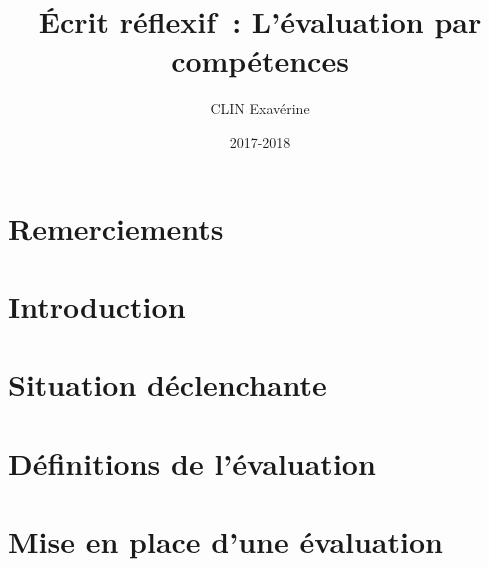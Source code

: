 \documentclass[a4paper, 12pt, french]{article}
\title{Écrit réflexif~: L'évaluation par compétences}
\author{CLIN Exavérine}
\date{2017-2018}
\begin{document}


\thispagestyle{empty}

\newpage
\part*{Remerciements}

\thispagestyle{empty}

%


\newpage
\tableofcontents

\newpage
\part{Introduction}


\newpage
\part{Situation déclenchante}

\setcounter{section}{0}

\newpage
\part{Définitions de l'évaluation}

\setcounter{section}{0}

\newpage
\part{Mise en place d'une évaluation}

\setcounter{section}{0}

%
\end{document}
